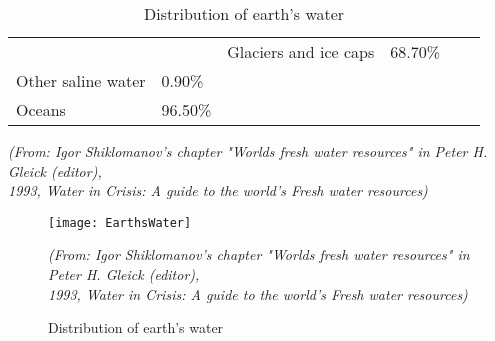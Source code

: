 \begin{itemize}
\begin{table}[ht]
\begin{center}
\begin{tabular}{|l|l|llll}
                             &                         & \multicolumn{1}{l|}{Glaciers and ice caps}          & \multicolumn{1}{l|}{68.70\%}                 &                                                &                              \\ \cline{1-4}
Other saline   water         & 0.90\%                  &                                                     &                                              &                                                &                              \\ \cline{1-2}
Oceans                       & 96.50\%                 &                                                     &                                              &                                                &                              \\ \cline{1-2}
\end{tabular}
\caption{Distribution of earth's water}  \label{Earth's water}
\textit{(From:  Igor Shiklomanov's chapter "Worlds fresh water resources" in Peter H. Gleick (editor), \\1993, Water in Crisis: A guide to the world's Fresh water resources)}
\end{center}
\end{table}

\begin{figure}[]
\begin{center}
\texttt{[image: EarthsWater]}
\caption{Distribution of earth's water}  \label{Distribution of earth's water}
\textit{(From:  Igor Shiklomanov's chapter "Worlds fresh water resources" in Peter H. Gleick (editor), \\1993, Water in Crisis: A guide to the world's Fresh water resources)}
\end{center}
\end{figure}


\end{itemize}
